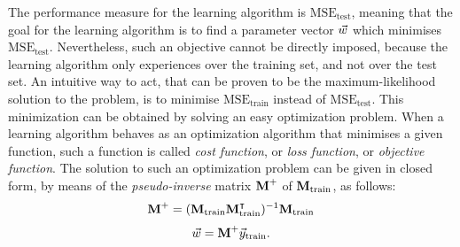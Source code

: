 The performance measure for the learning algorithm is $\mathrm{MSE_{test}}$, meaning that the goal for the learning algorithm is to find a parameter vector $\vec{w}$ which minimises $\mathrm{MSE_{test}}$. Nevertheless, such an objective cannot be directly imposed, because the learning algorithm only experiences over the training set, and not over the test set. An intuitive way to act, that can be proven to be the maximum-likelihood solution to the problem, is to minimise  $\mathrm{MSE_{train}}$ instead of $\mathrm{MSE_{test}}$. This minimization can be obtained by solving an easy optimization problem. When a learning algorithm behaves as an optimization algorithm that minimises a given function, such a function is called \emph{cost function}, or \emph{loss function}, or \emph{objective function}. 
The solution to such an optimization problem can be given in closed form, by means of the \emph{pseudo-inverse} matrix $\textbf{M}^+$ of $\textbf{M}_{\text{train}}$, as follows:
\begin{equation}
\textbf{M}^+ = (\textbf{M}_{\text{train}}\textbf{M}_{\text{train}}^\intercal)^{-1}\textbf{M}_{\text{train}}
\end{equation}
\begin{equation}
\vec{w} = \textbf{M}^+\vec{y}_{\text{train}}.
\end{equation}

